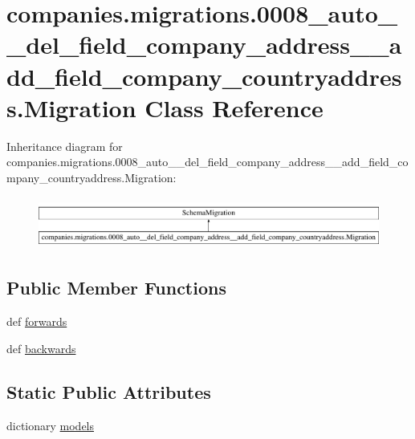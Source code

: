 \hypertarget{classcompanies_1_1migrations_1_10008__auto____del__field__company__address____add__field__company__countryaddress_1_1_migration}{\section{companies.\-migrations.0008\-\_\-auto\-\_\-\-\_\-del\-\_\-field\-\_\-company\-\_\-address\-\_\-\-\_\-add\-\_\-field\-\_\-company\-\_\-countryaddress.Migration Class Reference}
\label{classcompanies_1_1migrations_1_10008__auto____del__field__company__address____add__field__company__countryaddress_1_1_migration}
}
Inheritance diagram for companies.\-migrations.0008\-\_\-auto\-\_\-\-\_\-del\-\_\-field\-\_\-company\-\_\-address\-\_\-\-\_\-add\-\_\-field\-\_\-company\-\_\-countryaddress.Migration\-:\begin{figure}[H]
\begin{center}
\leavevmode
\includegraphics[height=1.717791cm]{classcompanies_1_1migrations_1_10008__auto____del__field__company__address____add__field__company__countryaddress_1_1_migration}
\end{center}
\end{figure}
\subsection*{Public Member Functions}
\begin{DoxyCompactItemize}
\item 
def \hyperlink{classcompanies_1_1migrations_1_10008__auto____del__field__company__address____add__field__company__countryaddress_1_1_migration_a23b925091cfd2ea40a5162c69a0df3c2}{forwards}
\item 
def \hyperlink{classcompanies_1_1migrations_1_10008__auto____del__field__company__address____add__field__company__countryaddress_1_1_migration_ac8a2bfb2e55da103bf8679ac30ae5c95}{backwards}
\end{DoxyCompactItemize}
\subsection*{Static Public Attributes}
\begin{DoxyCompactItemize}
\item 
dictionary \hyperlink{classcompanies_1_1migrations_1_10008__auto____del__field__company__address____add__field__company__countryaddress_1_1_migration_a238f1b4ca3b01257cec855d217b0b2bc}{models}
\end{DoxyCompactItemize}



